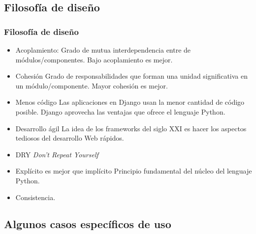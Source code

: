 \documentclass{beamer}
\begin{document}
\subsection{Filosofía de diseño}
\begin{frame}
\frametitle{Filosofía de diseño}
\begin{itemize}
\item<1-> \alert{Acoplamiento}: Grado de mutua interdependencia entre de
módulos/componentes. Bajo acoplamiento es mejor.
\item<2-> \alert{Cohesión} Grado de responsabilidades que forman una unidad
significativa en un módulo/componente. Mayor cohesión es mejor.
\item<3-> \alert{Menos código} Las aplicaciones en Django usan la menor cantidad de
código posible. Django aprovecha las ventajas que ofrece el lenguaje Python.
\item<4-> \alert{Desarrollo ágil} La idea de los \alert{frameworks} del siglo XXI es
hacer los aspectos tediosos del desarrollo Web rápidos.
\item<5->\alert{DRY} \emph{Don't Repeat Yourself}
\item<6-> \alert{Explícito es mejor que implícito} Principio fundamental del núcleo del
lenguaje \alert{Python}.
\item<7-> Consistencia.
\end{itemize}
\end{frame}


\subsection{Algunos casos específicos de uso}
\end{document}
